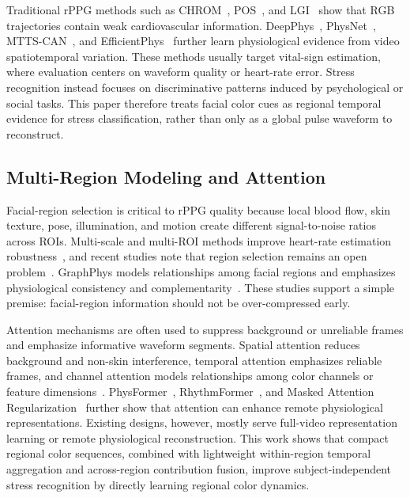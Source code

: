\documentclass[runningheads]{llncs}
\begin{document}
Traditional rPPG methods such as CHROM~\cite{dehaan2013chrom}, POS~\cite{wang2017pos}, and LGI~\cite{pilz2018lgi} show that RGB trajectories contain weak cardiovascular information. DeepPhys~\cite{chen2018deepphys}, PhysNet~\cite{yu2019physnet}, MTTS-CAN~\cite{liu2020mttscan}, and EfficientPhys~\cite{liu2023efficientphys} further learn physiological evidence from video spatiotemporal variation. These methods usually target vital-sign estimation, where evaluation centers on waveform quality or heart-rate error. Stress recognition instead focuses on discriminative patterns induced by psychological or social tasks. This paper therefore treats facial color cues as regional temporal evidence for stress classification, rather than only as a global pulse waveform to reconstruct.

\subsection{Multi-Region Modeling and Attention}

Facial-region selection is critical to rPPG quality because local blood flow, skin texture, pose, illumination, and motion create different signal-to-noise ratios across ROIs. Multi-scale and multi-ROI methods improve heart-rate estimation robustness~\cite{zhao2020multiscale}, and recent studies note that region selection remains an open problem~\cite{bondarenko2025regions}. GraphPhys models relationships among facial regions and emphasizes physiological consistency and complementarity~\cite{xiong2023graphphys}. These studies support a simple premise: facial-region information should not be over-compressed early.

Attention mechanisms are often used to suppress background or unreliable frames and emphasize informative waveform segments. Spatial attention reduces background and non-skin interference, temporal attention emphasizes reliable frames, and channel attention models relationships among color channels or feature dimensions~\cite{chen2018deepphys,liu2020mttscan,xu2024mtasr}. PhysFormer~\cite{yu2022physformer}, RhythmFormer~\cite{zou2025rhythmformer}, and Masked Attention Regularization~\cite{zhao2024mar} further show that attention can enhance remote physiological representations. Existing designs, however, mostly serve full-video representation learning or remote physiological reconstruction. This work shows that compact regional color sequences, combined with lightweight within-region temporal aggregation and across-region contribution fusion, improve subject-independent stress recognition by directly learning regional color dynamics.
\end{document}

